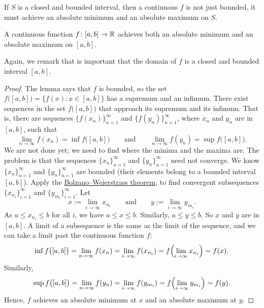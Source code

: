 If $S$ is a closed
and bounded interval, then a continuous $f$
is not just bounded, it must achieve an absolute minimum and an absolute
maximum on $S$.

\begin{thm}
%
%
%
A continuous function $f \colon [a,b] \to {\mathbb{R}}$
achieves both an absolute minimum and an absolute maximum on $[a,b]$.
\end{thm}

Again, we remark that is important that the domain of $f$ is a closed and bounded interval $[a,b]$.

\begin{proof}
The lemma says that $f$ is bounded, so
the set $f\bigl([a,b]\bigr) = \bigl\{ f(x) : x \in [a,b] \bigr\}$ has a supremum and an infimum.
There exist sequences
in the set $f\bigl([a,b]\bigr)$ that approach its supremum and its infimum.
That is, there are sequences
$\bigl\{ f(x_n) \bigr\}_{n=1}^\infty$ and $\bigl\{ f(y_n)
\bigr\}_{n=1}^\infty$, where $x_n$ and $y_n$ are in $[a,b]$,
such that
\begin{equation*}
\lim_{n\to\infty} f(x_n) = \inf f\bigl([a,b]\bigr) \qquad \text{and} \qquad
\lim_{n\to\infty} f(y_n) = \sup f\bigl([a,b]\bigr).
\end{equation*}
We are not done yet; we need to find where the minima and the maxima are.
The problem is that the sequences $\{ x_n \}_{n=1}^\infty$ and
$\{ y_n \}_{n=1}^\infty$ need not converge.
We know $\{ x_n \}_{n=1}^\infty$ and $\{ y_n \}_{n=1}^\infty$ are bounded
(their elements belong to a bounded interval $[a,b]$).
Apply the 
\hyperref[thm:bwseq]{Bolzano--Weierstrass theorem},
to find
convergent subsequences
$\{ x_{n_i} \}_{i=1}^\infty$ and 
$\{ y_{m_i} \}_{i=1}^\infty$.  Let
\begin{equation*}
x := \lim_{i\to\infty} x_{n_i}
\qquad \text{and} \qquad
y := \lim_{i\to\infty} y_{m_i}.
\end{equation*}
As $a \leq x_{n_i} \leq b$ for all $i$, we have $a \leq x \leq b$.
Similarly, $a \leq y \leq b$.  So $x$ and $y$ are in $[a,b]$.
A limit of a subsequence is the same as the limit of the
sequence, and we can take a limit past the continuous function $f$:
\begin{equation*}
\inf f\bigl([a,b]\bigr) = \lim_{n\to\infty} f(x_n)
= \lim_{i\to\infty} f(x_{n_i}) = 
f \Bigl( \lim_{i\to\infty} x_{n_i} \Bigr) = f(x) .
\end{equation*}
Similarly,
\begin{equation*}
\sup f\bigl([a,b]\bigr) = \lim_{n\to\infty} f(y_n)
= \lim_{i\to\infty} f(y_{m_i}) = 
f \Bigl( \lim_{i\to\infty} y_{m_i} \Bigr) = f(y) .
\end{equation*}
Hence, $f$ achieves an absolute minimum at $x$ and
an absolute maximum at $y$.
\end{proof}

